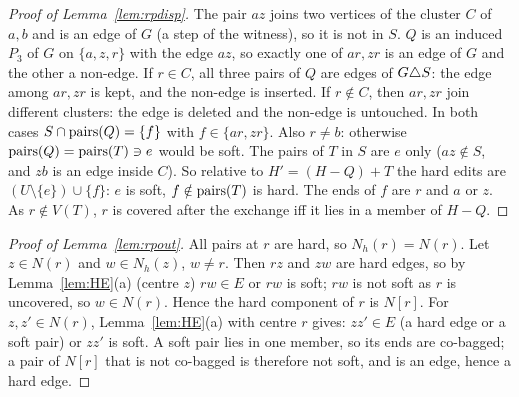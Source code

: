 \begin{proof}[Proof of Lemma~\ref{lem:rpdisp}]
The pair $az$ joins two vertices of the cluster $C$ of $a,b$ and is an edge of $G$ (a step of the witness), so it is not in $S$. $Q$ is an induced $P_3$ of $G$ on $\{a,z,r\}$ with the edge $az$, so exactly one of $ar,zr$ is an edge of $G$ and the other a non-edge. If $r\in C$, all three pairs of $Q$ are edges of $G\triangle S$: the edge among $ar,zr$ is kept, and the non-edge is inserted. If $r\notin C$, then $ar,zr$ join different clusters: the edge is deleted and the non-edge is untouched. In both cases $S\cap\mathrm{pairs}(Q)=\{f\}$ with $f\in\{ar,zr\}$. Also $r\ne b$: otherwise $\mathrm{pairs}(Q)=\mathrm{pairs}(T)\ni e$ would be soft. The pairs of $T$ in $S$ are $e$ only ($az\notin S$, and $zb$ is an edge inside $C$). So relative to $H'=(H-Q)+T$ the hard edits are $(U\setminus\{e\})\cup\{f\}$: $e$ is soft, $f\notin\mathrm{pairs}(T)$ is hard. The ends of $f$ are $r$ and $a$ or $z$. As $r\notin V(T)$, $r$ is covered after the exchange iff it lies in a member of $H-Q$.
\end{proof}

\begin{proof}[Proof of Lemma~\ref{lem:rpout}]
All pairs at $r$ are hard, so $N_h(r)=N(r)$. Let $z\in N(r)$ and $w\in N_h(z)$, $w\ne r$. Then $rz$ and $zw$ are hard edges, so by Lemma~\ref{lem:HE}(a) (centre $z$) $rw\in E$ or $rw$ is soft; $rw$ is not soft as $r$ is uncovered, so $w\in N(r)$. Hence the hard component of $r$ is $N[r]$. For $z,z'\in N(r)$, Lemma~\ref{lem:HE}(a) with centre $r$ gives: $zz'\in E$ (a hard edge or a soft pair) or $zz'$ is soft. A soft pair lies in one member, so its ends are co-bagged; a pair of $N[r]$ that is not co-bagged is therefore not soft, and is an edge, hence a hard edge.
\end{proof}

